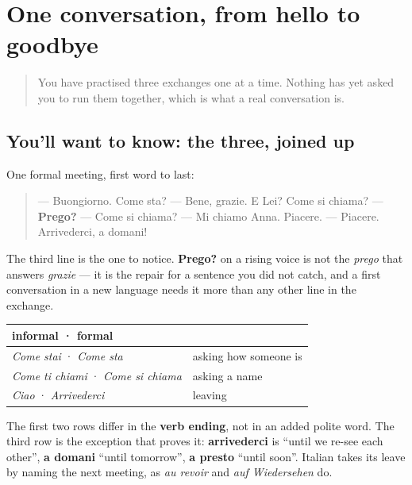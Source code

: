 \section[(practice)]{One conversation, from hello to goodbye}

\label{lesson:IT-C05-second-pass-first-conversation}



\begin{quote}
You have practised three exchanges one at a time. Nothing has yet asked you to run them together, which is what a real conversation is.
\end{quote}

\subsection*{You'll want to know: the three, joined up}
One formal meeting, first word to last:

\begin{quote}
— Buongiorno. Come sta? — Bene, grazie. E Lei? Come si chiama? — \textbf{Prego?} — Come si chiama? — Mi chiamo Anna. Piacere. — Piacere. Arrivederci, a domani!
\end{quote}

The third line is the one to notice. \textbf{Prego?} on a rising voice is not the \emph{prego} that answers \emph{grazie} — it is the repair for a sentence you did not catch, and a first conversation in a new language needs it more than any other line in the exchange.

\begin{grammarlens}[title={What you've built — three chapters in one view}]
\noindent
\begin{tabularx}{\linewidth}{@{}>{\raggedright\arraybackslash}X>{\raggedright\arraybackslash}X@{}}
\toprule
\textbf{informal · formal} & \textbf{} \\
\midrule
\emph{Come stai} · \emph{Come sta} & asking how someone is \\
\emph{Come ti chiami} · \emph{Come si chiama} & asking a name \\
\emph{Ciao} · \emph{Arrivederci} & leaving \\
\bottomrule
\end{tabularx}

The first two rows differ in the \textbf{verb ending}, not in an added polite word. The third row is the exception that proves it: \textbf{arrivederci} is \textquotedblleft{}until we re-see each other\textquotedblright{}, \textbf{a domani} \textquotedblleft{}until tomorrow\textquotedblright{}, \textbf{a presto} \textquotedblleft{}until soon\textquotedblright{}. Italian takes its leave by naming the next meeting, as \emph{au revoir} and \emph{auf Wiedersehen} do.
\end{grammarlens}

